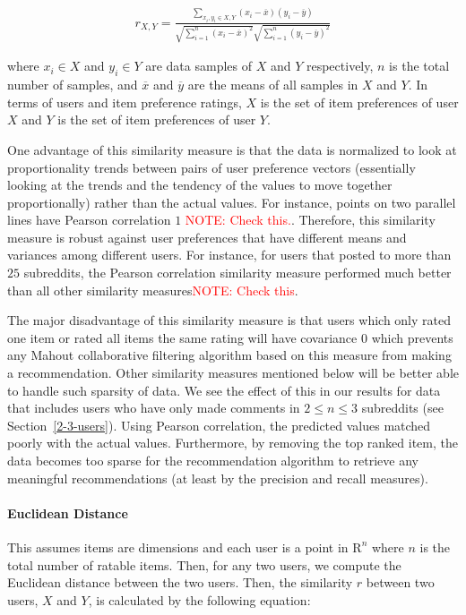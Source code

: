 \documentclass{article}
\begin{document}
\begin{align*}
r_{X, Y} = \frac{\sum_{x_i, y_i \in X, Y} (x_i - \overline{x})(y_i - \overline{y})}{\sqrt{\sum_{i = 1}^n (x_i - \overline{x})^2}\sqrt{\sum_{i=1}^n (y_i - \overline{y})^2}}
\end{align*}

where $x_i \in X$ and $y_i \in Y$ are data samples of $X$ and $Y$ respectively, $n$ is the total number of samples,
and $\overline{x}$ and $\overline{y}$ are the means of all samples in $X$ and $Y$. In terms of users and 
item preference ratings, $X$ is the set of item preferences of user $X$ and $Y$ is the set of item 
preferences of user $Y$. 

One advantage of this similarity measure is that the data is normalized to look at proportionality trends between 
pairs of user preference vectors (essentially looking at the trends and the tendency of the values to move 
together proportionally) rather than the actual values. For instance, points on two parallel lines have Pearson 
correlation $1$ \textcolor{red}{NOTE: Check this.}. Therefore, this similarity measure is robust against user preferences that have different means and variances among different users. For instance, for users that
posted to more than $25$ subreddits, the Pearson correlation similarity measure performed much
better than all other similarity measures\textcolor{red}{NOTE: Check this}.

The major disadvantage of this similarity measure is that users which only rated one item or rated all items the 
same rating will have covariance $0$ which prevents any Mahout collaborative filtering algorithm based 
on this measure from making a recommendation. Other similarity measures mentioned below will be better able
to handle such sparsity of data. We see the effect of this in our results for data that includes users who have
only made comments in $2 \leq n \leq 3$ subreddits (see Section~\ref{2-3-users}). 
Using Pearson correlation, the predicted values matched poorly
with the actual values. Furthermore, by removing the top ranked item, the data becomes too sparse for the recommendation algorithm to retrieve any meaningful recommendations (at least by the precision and recall measures).

\paragraph{Euclidean Distance}

This assumes items are dimensions and each user is a point in $\mathrm{R}^n$ where $n$ is the total
number of ratable items. Then, for any two users, we compute the Euclidean distance between the two users.
Then, the similarity $r$ between two users, $X$ and $Y$, is calculated by the following equation:
\end{document}
